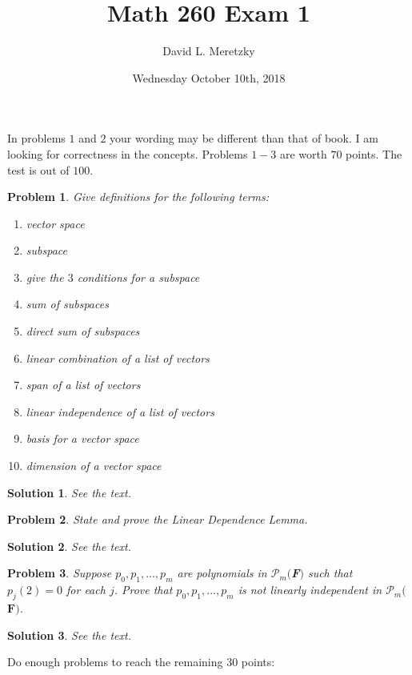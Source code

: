 \documentclass{article}
\title{ \vspace{-10ex} %
Math 260 Exam 1
}
\author{David L. Meretzky
}
\date{%
Wednesday October 10th, 2018
}
\theoremstyle{problemstyle}
\newtheorem{problem}{Problem}
\theoremstyle{problemstyle}
\newtheorem{solution}{Solution}
\theoremstyle{problemstyle}
\begin{document}
\maketitle

In problems $1$ and $2$ your wording may be different than that of book. I am looking for correctness in the concepts. Problems $1-3$ are worth $70$ points.  The test is out of $100$. 

\begin{problem}
Give definitions for the following terms:
\begin{enumerate}
\item vector space 
\item subspace 
\item give the $3$ conditions for a subspace
\item sum of subspaces
\item direct sum of subspaces
\item linear combination of a list of vectors
\item span of a list of vectors
\item linear independence of a list of vectors
\item basis for a vector space 
\item dimension of a vector space
\end{enumerate}
\end{problem}

\begin{solution}
See the text. 
\end{solution}

\begin{problem}
State and prove the Linear Dependence Lemma.
\end{problem}

\begin{solution}
See the text. 
\end{solution}

\begin{problem}
Suppose $p_0, p_1,..., p_m$ are polynomials in $\mathcal{P}_m$$($\textbf{F}$)$ such that $p_j(2) = 0$ for each $j$. Prove that $p_0, p_1,..., p_m$ is not linearly independent in $\mathcal{P}_m$$($$\textbf{F}$$)$.
\end{problem}

\begin{solution}
See the text. 
\end{solution}

Do enough problems to reach the remaining $30$ points:
\end{document}
